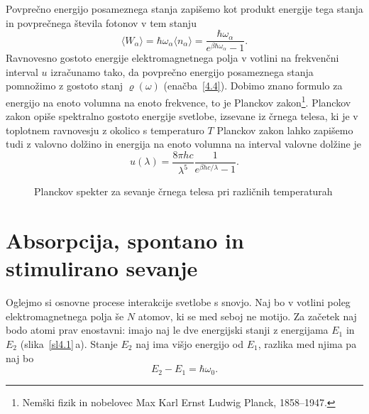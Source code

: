 Povprečno energijo posameznega stanja zapišemo kot produkt energije tega stanja in 
povprečnega števila fotonov v tem stanju
\begin{equation}
\langle W_{\alpha}\rangle = \hbar \omega_\alpha \langle n_\alpha \rangle
= \frac{\hbar \omega_\alpha}{e^{\beta\hbar\omega_{\alpha}}-1}.
\end{equation}
Ravnovesno gostoto energije elektromagnetnega polja v votlini na
frekvenčni interval $u$ izračunamo tako, da povprečno energijo posameznega
stanja pomnožimo z gostoto stanj $\varrho (\omega)$ 
(enačba~\ref{4.4}). Dobimo znano formulo za energijo na enoto volumna na enoto frekvence, 
to je Planckov 
zakon\footnote{Nemški fizik in nobelovec Max Karl Ernst Ludwig Planck, 1858--1947.}.
Planckov zakon opiše spektralno gostoto energije svetlobe, izsevane iz 
črnega telesa, ki je v toplotnem ravnovesju z 
okolico s temperaturo $T$
Planckov zakon lahko zapišemo tudi z valovno dolžino in energija na enoto volumna
na interval valovne dolžine je
\begin{equation}
u(\lambda)=\frac{8 \pi h c}{\lambda^5}\frac{1}{e^{\beta h c/\lambda}-1}.
\end{equation}

\begin{figure}[h]
\centering
\def\svgwidth{110truemm} 

\caption{Planckov spekter za sevanje črnega telesa pri različnih temperaturah}
\label{fig:Planck}
\end{figure}

\section{Absorpcija, spontano in stimulirano sevanje}
Oglejmo si osnovne procese interakcije svetlobe s snovjo. Naj
bo v votlini poleg elektro\-magnet\-nega polja še $N$ atomov, ki se med
seboj ne motijo. Za začetek naj bodo atomi prav enostavni:
imajo naj le dve energijski stanji z energijama $E_{1}$ in $E_{2}$ (slika~\ref{sl4.1}\,a). 
Stanje $E_2$ naj ima višjo energijo od $E_1$, razlika med njima pa naj bo
\begin{equation}
 E_2 - E_1 = \hbar \omega_0.
\end{equation}

